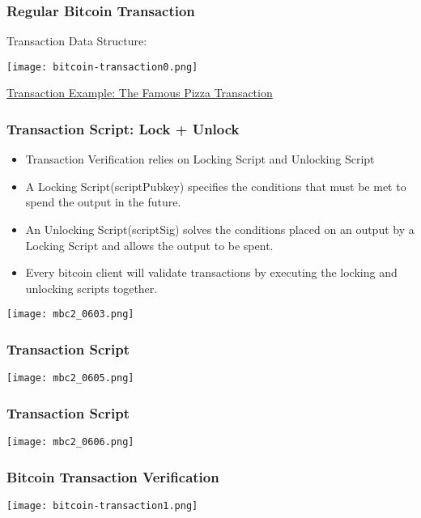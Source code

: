 \begin{frame}
    \frametitle{Regular Bitcoin Transaction}
    Transaction Data Structure:
    \begin{center}
        \texttt{[image: bitcoin-transaction0.png]} \\
    \end{center}
    \href{https://blockchain.info/tx/cca7507897abc89628f450e8b1e0c6fca4ec3f7b34cccf55f3f531c659ff4d79}{Transaction Example: The Famous Pizza Transaction}
\end{frame}

\begin{frame}
    \frametitle{Transaction Script: Lock + Unlock}
    \begin{itemize}
        \item Transaction Verification relies on \alert{Locking Script} and \alert{Unlocking Script}
        \item A Locking Script(\alert{scriptPubkey}) specifies the conditions that must be met to spend the output in the future.
        \item An Unlocking Script(\alert{scriptSig}) solves the conditions placed on an output by a Locking Script and allows the output to be spent.
        \item Every bitcoin client will validate transactions by executing the locking and unlocking scripts together.
    \end{itemize}
    \begin{center}
        \texttt{[image: mbc2\_0603.png]}
    \end{center}
\end{frame}

\begin{frame}
    \frametitle{Transaction Script}
    \texttt{[image: mbc2\_0605.png]}
\end{frame}

\begin{frame}
    \frametitle{Transaction Script}
    \texttt{[image: mbc2\_0606.png]}
\end{frame}

\begin{frame}
    \frametitle{Bitcoin Transaction Verification}
    \texttt{[image: bitcoin-transaction1.png]}
\end{frame}

